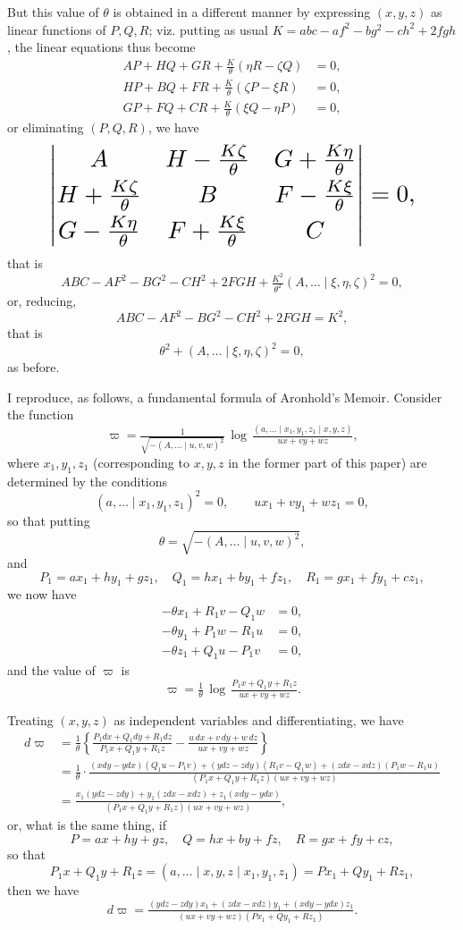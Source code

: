 \documentclass[11pt]{article}
\begin{document}
But this value of $\theta$ is obtained in a different manner by expressing $(x,y,z)$ as linear functions of $P,Q,R$; viz. putting as usual $K = abc - af^2 - bg^2 - ch^2 + 2fgh$, the linear equations thus become
\begin{align*}
AP + HQ + GR + \tfrac{K}{\theta}(\eta R - \zeta Q) &= 0,\\
HP + BQ + FR + \tfrac{K}{\theta}(\zeta P - \xi R) &= 0,\\
GP + FQ + CR + \tfrac{K}{\theta}(\xi Q - \eta P) &= 0,
\end{align*}
or eliminating $(P,Q,R)$, we have
\[ \resizebox{0.85\textwidth}{!}{$\displaystyle \begin{vmatrix} A & H - \tfrac{K\zeta}{\theta} & G + \tfrac{K\eta}{\theta} \\[2pt] H + \tfrac{K\zeta}{\theta} & B & F - \tfrac{K\xi}{\theta} \\[2pt] G - \tfrac{K\eta}{\theta} & F + \tfrac{K\xi}{\theta} & C \end{vmatrix} = 0$,} \]
that is
\[ ABC - AF^2 - BG^2 - CH^2 + 2FGH + \tfrac{K^2}{\theta^2}(A,\ldots \mid \xi,\eta,\zeta)^2 = 0, \]
or, reducing,
\[ ABC - AF^2 - BG^2 - CH^2 + 2FGH = K^2, \]
that is
\[ \theta^2 + (A,\ldots \mid \xi,\eta,\zeta)^2 = 0, \]
as before.

I reproduce, as follows, a fundamental formula of Aronhold's Memoir. Consider the function
\[ \varpi = \tfrac{1}{\sqrt{-(A,\ldots\mid u,v,w)^2}}\,\log\,\tfrac{(a,\ldots\mid x_1,y_1,z_1 \mid x,y,z)}{ux+vy+wz}, \]
where $x_1,y_1,z_1$ (corresponding to $x,y,z$ in the former part of this paper) are determined by the conditions
\[ (a,\ldots \mid x_1,y_1,z_1)^2 = 0,\qquad ux_1 + vy_1 + wz_1 = 0, \]
so that putting
\[ \theta = \sqrt{-(A,\ldots\mid u,v,w)^2}, \]
and
\[ P_1 = ax_1 + hy_1 + gz_1,\quad Q_1 = hx_1 + by_1 + fz_1,\quad R_1 = gx_1 + fy_1 + cz_1, \]
we now have
\begin{align*}
-\theta x_1 + R_1 v - Q_1 w &= 0,\\
-\theta y_1 + P_1 w - R_1 u &= 0,\\
-\theta z_1 + Q_1 u - P_1 v &= 0,
\end{align*}
and the value of $\varpi$ is
\[ \varpi = \tfrac{1}{\theta}\,\log\,\tfrac{P_1 x + Q_1 y + R_1 z}{ux+vy+wz}. \]

Treating $(x,y,z)$ as independent variables and differentiating, we have
\begin{align*}
d\varpi &= \tfrac{1}{\theta}\left\{ \tfrac{P_1 dx + Q_1 dy + R_1 dz}{P_1 x + Q_1 y + R_1 z} - \tfrac{u\,dx + v\,dy + w\,dz}{ux+vy+wz} \right\}\\
&= \tfrac{1}{\theta}\cdot\tfrac{(xdy-ydx)(Q_1 u - P_1 v) + (ydz-zdy)(R_1 v - Q_1 w) + (zdx - xdz)(P_1 w - R_1 u)}{(P_1 x + Q_1 y + R_1 z)(ux+vy+wz)}\\
&= \tfrac{x_1(ydz-zdy) + y_1(zdx-xdz) + z_1(xdy-ydx)}{(P_1 x + Q_1 y + R_1 z)(ux+vy+wz)},
\end{align*}
or, what is the same thing, if
\[ P = ax + hy + gz,\quad Q = hx + by + fz,\quad R = gx + fy + cz, \]
so that
\[ P_1 x + Q_1 y + R_1 z = (a,\ldots\mid x,y,z\mid x_1,y_1,z_1) = P x_1 + Q y_1 + R z_1, \]
then we have
\[ d\varpi = \tfrac{(ydz-zdy)x_1 + (zdx-xdz)y_1 + (xdy-ydx)z_1}{(ux+vy+wz)(Px_1+Qy_1+Rz_1)}. \]
\end{document}
